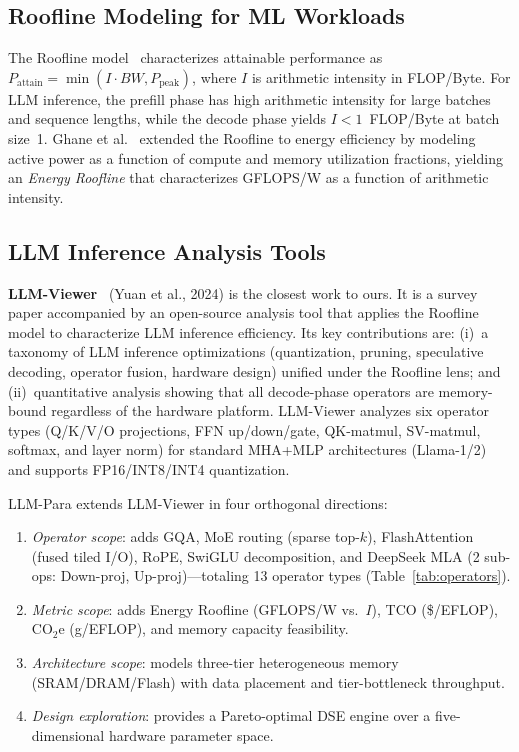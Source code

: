 \documentclass[journal]{IEEEtran}
\begin{document}
\subsection{Roofline Modeling for ML Workloads}

The Roofline model~\cite{roofline} characterizes attainable performance as
$P_\text{attain} = \min(I \cdot BW, P_\text{peak})$,
where $I$ is arithmetic intensity in FLOP/Byte.
For LLM inference, the prefill phase has high arithmetic intensity for
large batches and sequence lengths, while the decode phase yields
$I < 1$~FLOP/Byte at batch size~1.
Ghane et al.~\cite{energyroofline} extended the Roofline to energy
efficiency by modeling active power as a function of compute and memory
utilization fractions, yielding an \emph{Energy Roofline} that
characterizes GFLOPS/W as a function of arithmetic intensity.

\subsection{LLM Inference Analysis Tools}

\textbf{LLM-Viewer}~\cite{llmviewer} (Yuan et al., 2024) is the closest
work to ours. It is a survey paper accompanied by an open-source analysis
tool that applies the Roofline model to characterize LLM inference
efficiency.
Its key contributions are: (i)~a taxonomy of LLM inference optimizations
(quantization, pruning, speculative decoding, operator fusion, hardware
design) unified under the Roofline lens; and (ii)~quantitative analysis
showing that all decode-phase operators are memory-bound regardless of
the hardware platform.
LLM-Viewer analyzes six operator types (Q/K/V/O projections, FFN up/down/gate,
QK-matmul, SV-matmul, softmax, and layer norm) for standard MHA+MLP
architectures (Llama-1/2) and supports FP16/INT8/INT4 quantization.

LLM-Para extends LLM-Viewer in four orthogonal directions:
\begin{enumerate}
  \item \emph{Operator scope}: adds GQA, MoE routing (sparse top-$k$),
        FlashAttention (fused tiled I/O), RoPE, SwiGLU decomposition, and
        DeepSeek MLA (2 sub-ops: Down-proj, Up-proj)---totaling 13 operator types
        (Table~\ref{tab:operators}).
  \item \emph{Metric scope}: adds Energy Roofline (GFLOPS/W vs.\ $I$),
        TCO (\$/EFLOP), CO$_2$e (g/EFLOP), and memory capacity feasibility.
  \item \emph{Architecture scope}: models three-tier heterogeneous memory
        (SRAM/DRAM/Flash) with data placement and tier-bottleneck throughput.
  \item \emph{Design exploration}: provides a Pareto-optimal DSE engine
        over a five-dimensional hardware parameter space.
\end{enumerate}
\end{document}
